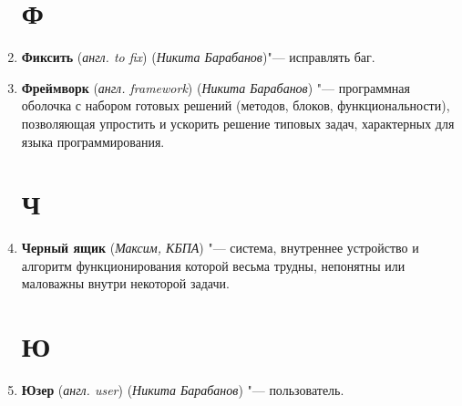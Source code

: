 \documentclass[14pt]{extarticle}
\begin{document}
\begin{enumerate}
    \section*{Ф}
    \item \textbf{Фиксить} (\textit{англ. to fix}) (\textit{Никита Барабанов})"--- исправлять баг.
    \item \textbf{Фреймворк} (\textit{англ. framework}) (\textit{Никита Барабанов}) "--- программная оболочка с набором готовых решений (методов, блоков, функциональности), позволяющая упростить и ускорить решение типовых задач, характерных для языка программирования.
    \section*{Ч}
    \item \textbf{Черный ящик} (\textit{Максим, КБПА}) "--- система, внутреннее устройство и алгоритм функционирования которой весьма трудны, непонятны или маловажны внутри некоторой задачи.
    \section*{Ю}
    \item \textbf{Юзер} (\textit{англ. user}) (\textit{Никита Барабанов}) "--- пользователь.
\end{enumerate}
\end{document}
